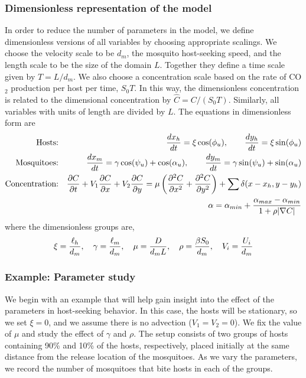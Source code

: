 \documentclass[11pt]{article}
\begin{document}
\subsubsection{Dimensionless representation of the model}
In order to reduce the number of parameters in the model, we define dimensionless
versions of all variables by choosing appropriate scalings. We choose the velocity
scale to be $d_m$, the mosquito host-seeking speed, and the length scale to be
the size of the domain $L$.  Together they define a time scale given by
$T = L/d_m$.  We also choose a concentration scale based on the rate of CO$_2$
production per host per time, $S_0T$.  In this way, the dimensionless
concentration is related to the dimensional concentration by $\hat{C} = C/(S_0T)$.
Similarly, all variables with units of length are divided by $L$.
The equations in dimensionless form are
\begin{eqnarray*}
\mbox{Hosts:}&&
\frac{dx_h}{dt} = \xi \cos(\phi_u),
\hskip20pt
\frac{dy_h}{dt} = \xi \sin(\phi_u) \\
\mbox{Mosquitoes:}&&
\frac{dx_m}{dt} = \gamma \cos(\psi_u) + \cos(\alpha_u),
\hskip20pt
\frac{dy_m}{dt} = \gamma \sin(\psi_u) + \sin(\alpha_u) \\
\mbox{Concentration:}&&
\frac{\partial C}{\partial t} + V_1\frac{\partial C}{\partial x}
+ V_2\frac{\partial C}{\partial y} = \mu
\left( \frac{\partial^2 C}{\partial x^2} + \frac{\partial^2 C}{\partial y^2} \right)
+ \sum\delta(x-x_h,y-y_h) \\
&& \alpha = \alpha_{min} + \frac{ \alpha_{max}-\alpha_{min}}{1 + \rho|\nabla C|}
\end{eqnarray*}
where the dimensionless groups are,
\[
\xi = \frac{\ell_h}{d_m},
\hskip10pt
\gamma = \frac{\ell_m}{d_m},
\hskip10pt
\mu = \frac{D}{d_m L},
\hskip10pt
\rho = \frac{\beta S_0}{d_m},
\hskip10pt
V_i = \frac{U_i}{d_m}
\]

\subsubsection{Example: Parameter study}
We begin with an example that will help gain insight into the effect of the
parameters in host-seeking behavior.  In this case, the hosts will be stationary,
so we set $\xi = 0$, and we assume there is no advection ($V_1 = V_2 = 0$).
We fix the value of $\mu$ and study the effect of $\gamma$ and $\rho$.  The setup
consists of two groups
of hosts containing 90\% and 10\% of the hosts, respectively, placed initially
at the same distance from the release location of the mosquitoes.  As we vary the
parameters, we record the number of mosquitoes that bite hosts in each of the groups.
\end{document}
